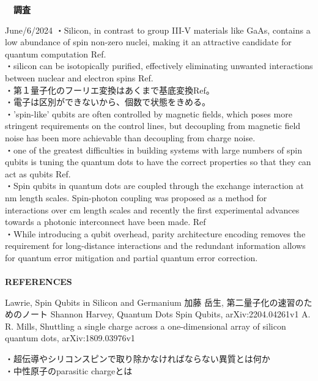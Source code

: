 \documentclass[a4paper,10.5pt]{ltjsarticle}
\begin{document}
\centerline
{\huge \bfseries　調査}
\rightline
{June/6/2024}
\leftline
{}
・Silicon, in contrast to group III-V materials like GaAs, contains a low abundance of spin non-zero nuclei, making it an attractive candidate for quantum computation Ref\cite{1}.\\
・silicon can be isotopically purified, effectively eliminating unwanted interactions between nuclear and electron spins Ref\cite{1}.\\
・第１量子化のフーリエ変換はあくまで基底変換Ref\cite{2}。\\
・電子は区別ができないから、個数で状態をきめる。\\
・'spin-like' qubits are often controlled by magnetic fields, which poses more stringent requirements on the control lines, but decoupling from magnetic field noise has been more achievable than decoupling from charge noise.\\
・one of the greatest difficulties in building systems with large numbers of spin qubits is tuning the quantum dots to have the correct properties so that they can act as qubits Ref\cite{3}.\\
・Spin qubits in quantum dots are coupled through the exchange interaction at  nm length scales. Spin-photon coupling was proposed as a method for interactions over cm length scales and recently the first experimental advances towards a photonic interconnect have been made. Ref\cite{4}\\
・While introducing a qubit overhead, parity architecture encoding removes the requirement for long-distance interactions and the redundant information allows for quantum error mitigation and partial quantum error correction.\\
\\
{\Large \bfseries REFERENCES}
\begin{thebibliography}{1}
\vspace{-1.5cm}
   Lawrie, Spin Qubits in Silicon and Germanium
   加藤 岳生, 第二量子化の速習のためのノート
   Shannon Harvey, Quantum Dots \/ Spin Qubits, arXiv:2204.04261v1
   A. R. Mills, Shuttling a single charge across a one-dimensional array of silicon quantum dots, arXiv:1809.03976v1
\end{thebibliography}
\vspace{50pt}
・超伝導やシリコンスピンで取り除かなければならない異質とは何か\\
・中性原子のparasitic chargeとは\\
\end{document}

